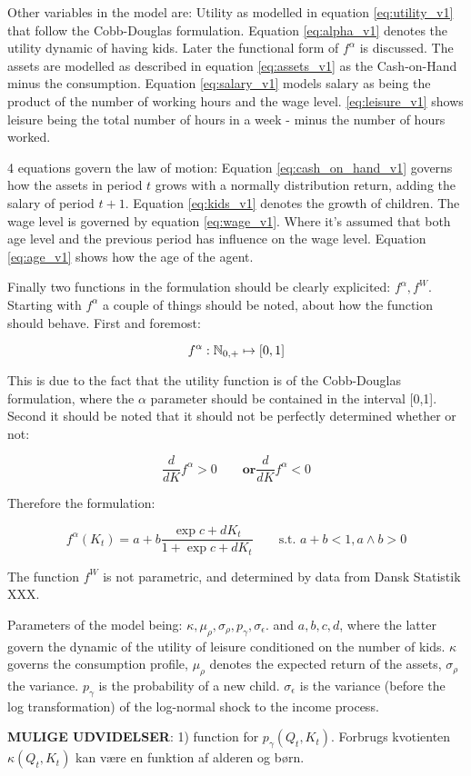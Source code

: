 Other variables in the model are: Utility as modelled in equation \eqref{eq:utility_v1} that follow the Cobb-Douglas formulation. Equation \eqref{eq:alpha_v1} denotes the utility dynamic of having kids. Later the functional form of $f^{\alpha}$ is discussed. The assets are modelled as described in equation \eqref{eq:assets_v1} as the Cash-on-Hand minus the consumption. Equation \eqref{eq:salary_v1} models salary as being the product of the number of working hours and the wage level. \eqref{eq:leisure_v1} shows leisure being the total number of hours in a week - minus the number of hours worked.

4 equations govern the law of motion: Equation \eqref{eq:cash_on_hand_v1} governs how the assets in period $t$ grows with a normally distribution return, adding the salary of period $t+1$. Equation \eqref{eq:kids_v1} denotes the growth of children. The wage level is governed by equation \eqref{eq:wage_v1}. Where it's assumed that both age level and the previous period has influence on the wage level. Equation \eqref{eq:age_v1} shows how the age of the agent.

Finally two functions in the formulation should be clearly explicited: $f^{\alpha}, f^{W}$. Starting with $f^{\alpha}$ a couple of things should be noted, about how the function should behave. First and foremost:

\begin{equation}
    f^{\alpha}: \mathbb{N}_{0,+} \mapsto [0,1]
\end{equation}

This is due to the fact that the utility function is of the Cobb-Douglas formulation, where the $\alpha$ parameter should be contained in the interval [0,1]. Second it should be noted that it should not be perfectly determined whether or not:

\begin{equation}
    \frac{d}{d K}f^{\alpha} > 0 \qquad \textbf{or} \frac{d}{d K}f^{\alpha} < 0
\end{equation}

Therefore the formulation:

\begin{equation}
    f^{\alpha} (K_t)= a + b \frac{\exp{c + d K_t}}{1 + \exp{c + d K_t}}\qquad  \text{s.t. } a + b < 1, a \land b > 0
\end{equation}

The function $f^{W}$ is not parametric, and determined by data from Dansk Statistik XXX.


Parameters of the model being: $\kappa, \mu_\rho, \sigma_\rho, p_\gamma, \sigma_\epsilon$. and $a, b, c, d$, where the latter govern the dynamic of the utility of leisure conditioned on the number of kids. $\kappa$ governs the consumption profile, $\mu_\rho$ denotes the expected return of the assets, $\sigma_\rho$ the variance. $p_\gamma$ is the probability of a new child. $\sigma_{\epsilon}$ is the variance (before the log transformation) of the log-normal shock to the income process.


\textbf{MULIGE UDVIDELSER}: 1) function for $p_\gamma (Q_t, K_t)$.  Forbrugs kvotienten $\kappa (Q_t, K_t)$ kan være en funktion af alderen og børn.
